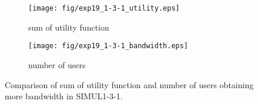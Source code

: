 	\begin{figure}
		\begin{center}
			\begin{subfigure}[b]{0.8\textwidth}
				\centering
				\texttt{[image: fig/exp19\_1-3-1\_utility.eps]}
				\caption{sum of utility function}
				\label{figure:simul1_3_1_u_a}
			\end{subfigure}
			\begin{subfigure}[b]{0.8\textwidth}
				\centering
				\texttt{[image: fig/exp19\_1-3-1\_bandwidth.eps]}
				\caption{number of users}
				\label{figure:simul1_3_1_u_b}
			\end{subfigure}
			\caption{Comparison of sum of utility function and number of users obtaining more bandwidth in SIMUL1-3-1.}
			\label{figure:simul1_3_1_u}
		\end{center}
	\end{figure}

\clearpage


